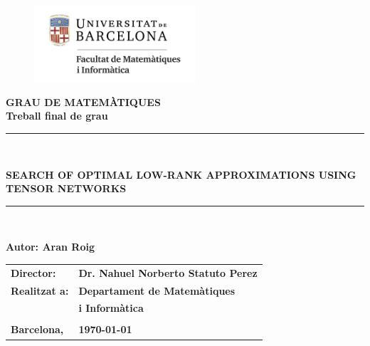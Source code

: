 \documentclass[11pt,a4paper,openright,oneside]{book}
\numberwithin{equation}{section}
\begin{document}



\thispagestyle{empty}

\begin{titlepage}
\begin{center}
\begin{figure}[htb]
\begin{center}
\includegraphics[width=6cm]{matematiquesinformatica-pos-rgb.png}
\end{center}
\end{figure}

\vspace*{1cm}
\textbf{\LARGE GRAU DE MATEM\`{A}TIQUES } \\
\vspace*{.5cm}
\textbf{\LARGE Treball final de grau} \\

\vspace*{1.5cm}
\rule{16cm}{0.1mm}\\
\begin{Huge}
\textbf{SEARCH OF OPTIMAL LOW-RANK APPROXIMATIONS USING TENSOR NETWORKS} \\
\end{Huge}
\rule{16cm}{0.1mm}\\

\vspace{1cm}

\begin{flushright}
\textbf{\LARGE Autor: Aran Roig}

\vspace*{2cm}

\renewcommand{\arraystretch}{1.5}
\begin{tabular}{ll}
\textbf{\Large Director:} & \textbf{\Large Dr. Nahuel Norberto Statuto Perez} \\
\textbf{\Large Realitzat a:} & \textbf{\Large  Departament de Matemàtiques   } \\
 & \textbf{\Large i Informàtica} \\
\\
\textbf{\Large Barcelona,} & \textbf{\Large \today }
\end{tabular}

\end{flushright}

\end{center}



\end{titlepage}
\end{document}
